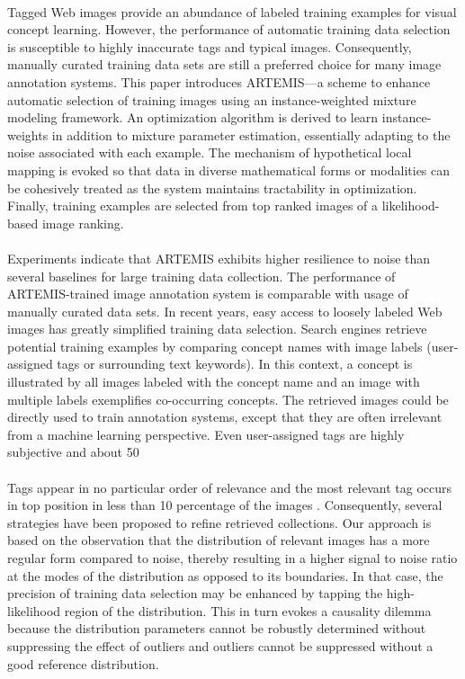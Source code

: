 \documentclass[a4paper,11pt]{report}
\begin{document}
\paragraph{}
Tagged Web images provide an abundance of labeled training examples for visual concept learning. However, the performance of automatic training data selection is susceptible to highly inaccurate tags and typical images. Consequently, manually curated training data sets are still a preferred choice for many image annotation systems. This paper introduces ARTEMIS—a scheme to enhance automatic selection of  training images using an instance-weighted mixture modeling framework. An optimization algorithm is derived to learn  instance-weights in addition to mixture parameter estimation, essentially adapting to the noise associated with each example. The mechanism of hypothetical local mapping is evoked so that data in diverse mathematical forms or modalities can be cohesively treated as the system maintains tractability in optimization. Finally, training examples are selected from top ranked images of a likelihood-based image ranking.
\paragraph{} 
Experiments indicate that ARTEMIS exhibits higher resilience to noise than several baselines for large training data collection. The performance of ARTEMIS-trained image annotation system is comparable with usage of manually curated data sets. In recent years, easy access to loosely labeled Web images has greatly simplified training data selection. Search engines retrieve potential training examples by comparing concept names with image labels (user-assigned tags or surrounding text keywords). In this context, a concept is illustrated by all images labeled with the concept name and an image with multiple labels exemplifies co-occurring concepts. The retrieved images could be directly used to train annotation systems, except that they are often irrelevant from a machine learning perspective. Even user-assigned tags are highly subjective and about 50%
\paragraph{}

Tags appear in no particular order of relevance and the most relevant tag occurs in top position in less than 10 percentage of the images . Consequently, several strategies have been proposed to refine retrieved collections. Our approach is based on the observation that the distribution of relevant images has a more regular form compared to noise, thereby resulting in a higher signal to noise ratio at the modes of the distribution as opposed to its boundaries. In that case, the precision of training data selection may be enhanced by tapping the high-likelihood region of the distribution. This in turn evokes a causality dilemma because the distribution parameters cannot be robustly determined without suppressing the effect of outliers and outliers cannot be suppressed without a good reference distribution.
\end{document}

